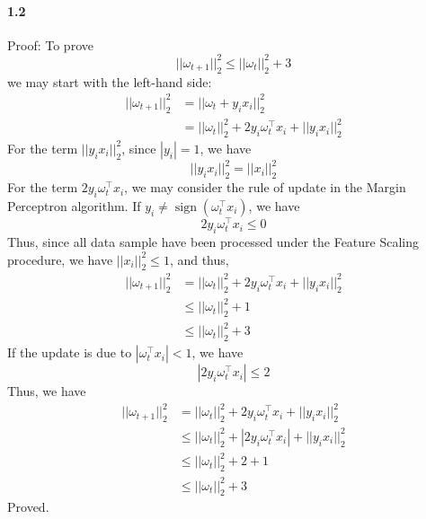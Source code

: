 \documentclass[11pt]{article}
\DeclareMathOperator*{\sgn}{\mathrm{sign}}
\begin{document}
\paragraph{1.2}
Proof:
\newline
To prove
\begin{equation}
  ||\omega_{t+1}||_2^2 \leq ||\omega_t||_2^2 + 3
\end{equation}
we may start with the left-hand side:
\begin{equation}
  \begin{split}
    ||\omega_{t+1}||_2^2 &= ||\omega_t + y_i x_i||_2^2 \\
    &= ||\omega_t||_2^2 + 2y_i\omega_t^\top x_i + ||y_i x_i||_2^2
  \end{split}
\end{equation}
For the term $||y_i x_i||_2^2$, since $|y_i|=1$, we have
\begin{equation}
  ||y_i x_i||_2^2 = ||x_i||_2^2
\end{equation}
For the term $2y_i\omega_t^\top x_i$, we may consider the rule of update in the Margin Perceptron algorithm. 
If $y_i \neq \sgn(\omega_t^\top x_i)$, we have
\begin{equation}
  2 y_i \omega_t^\top x_i \leq 0
\end{equation}
Thus, since all data sample have been processed under the Feature Scaling procedure, we have $||x_i||_2^2 \leq 1$, and thus,
\begin{equation}
  \begin{split}
    ||\omega_{t+1}||_2^2 &= ||\omega_t||_2^2 + 2y_i\omega_t^\top x_i + ||y_i x_i||_2^2 \\
    &\leq ||\omega_t||_2^2 + 1 \\
    &\leq ||\omega_t||_2^2 + 3
  \end{split}
\end{equation}
If the update is due to $|\omega_t^\top x_i| < 1$, we have
\begin{equation}
  |2 y_i \omega_t^\top x_i| \leq 2
\end{equation}
Thus, we have
\begin{equation}
  \begin{split}
    ||\omega_{t+1}||_2^2 &= ||\omega_t||_2^2 + 2y_i\omega_t^\top x_i + ||y_i x_i||_2^2 \\
    &\leq ||\omega_t||_2^2 + |2y_i\omega_t^\top x_i| + ||y_i x_i||_2^2 \\
    &\leq ||\omega_t||_2^2 + 2 + 1 \\
    &\leq ||\omega_t||_2^2 + 3
  \end{split}
\end{equation}
Proved.
\end{document}
